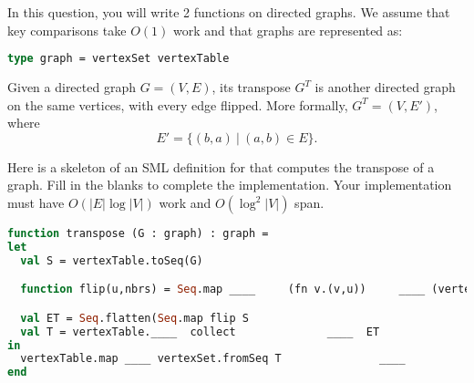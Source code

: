 
In this question, you will write 2 functions on directed graphs.
We assume that key comparisons take $O(1)$ work  and  that graphs are represented as:
\begin{lstlisting}[language=Caml, numbers=none]
type graph = vertexSet vertexTable
\end{lstlisting}


\begin{problem}[10.]
Given a directed graph $G = (V,E)$, its transpose $G^T$ is
another directed graph on the same vertices, with every edge flipped.
More formally, $G^T = (V,E')$, where
$$E' = \{(b,a)~|~(a,b) \in E \}.$$

\ask
Here is a skeleton of an SML definition for  that computes
the transpose of a graph. Fill in the blanks to complete the implementation.
Your implementation must have $O(|E| \log |V|)$ work and $O(\log^2 |V|)$
span.

\solfin

\begin{lstlisting}[language=Caml,numbers=none]
function transpose (G : graph) : graph = 
let
  val S = vertexTable.toSeq(G)    

  function flip(u,nbrs) = Seq.map ____     (fn v.(v,u))     ____ (vertexSet.toSeq nbrs)

  val ET = Seq.flatten(Seq.map flip S
  val T = vertexTable.____  collect              ____  ET
in
  vertexTable.map ____ vertexSet.fromSeq T               ____
end
\end{lstlisting} 
\end{problem}


